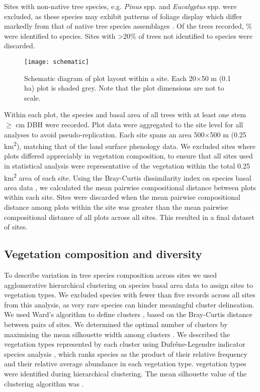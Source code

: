 \documentclass[11pt,a4paper]{article}
\begin{document}
Sites with non-native tree species, e.g. \textit{Pinus} spp. and
\textit{Eucalyptus} spp. were excluded, as these species may exhibit patterns
of foliage display which differ markedly from that of native tree species
assemblages \citep{Broadhead2003}. Of the \nTrees{} trees recorded,
\perSpID{}\% were identified to species. Sites with >20\% of trees not
identified to species were discarded.

\begin{figure}[H]
\centering
	\texttt{[image: schematic]}
	\caption{Schematic diagram of plot layout within a site. Each 20$\times$50
		m (0.1 ha) plot is shaded grey. Note that the plot dimensions are not to
		scale.}
	\label{schematic}
\end{figure}

Within each plot, the species and basal area of all trees with at least one
stem $\geq$\stemSize{} cm DBH were recorded. Plot data were aggregated to the
site level for all analyses to avoid pseudo-replication. Each site spans an
area 500$\times$500 m (0.25 km\textsuperscript{2}), matching that of the land
surface phenology data. We excluded sites where plots differed appreciably in
vegetation composition, to ensure that all sites used in statistical analysis
were representative of the vegetation within the total 0.25
km\textsuperscript{2} area of each site. Using the Bray-Curtis dissimilarity
index on species basal area data \citep{Faith1987}, we calculated the mean
pairwise compositional distance between plots within each site. Sites were
discarded when the mean pairwise compositional distance among plots within the
site was greater than the mean pairwise compositional distance of all plots
across all sites. This resulted in a final dataset of \plotDistN{} sites.

\subsection{Vegetation composition and diversity} 

To describe variation in tree species composition across sites we used
agglomerative hierarchical clustering on species basal area data
\citep{Kreft2010, Fayolle2014} to assign sites to vegetation types. We excluded
species with fewer than five records across all sites from this analysis, as
very rare species can hinder meaningful cluster delineation. We used Ward's
algorithm to define clusters \citep{Murtagh2014}, based on the Bray-Curtis
distance between pairs of sites. We determined the optimal number of clusters
by maximising the mean silhouette width among clusters \citep{Rousseeuw1987}.
We described the vegetation types represented by each cluster using
Dufr\^{e}ne-Legendre indicator species analysis \citep{Dufrene1997}, which
ranks species as the product of their relative frequency and their relative
average abundance in each vegetation type. \Numberstringnum{\nCluster}
vegetation types were identified during hierarchical clustering. The mean
silhouette value of the clustering algorithm was \silBest{}. 
\end{document}
